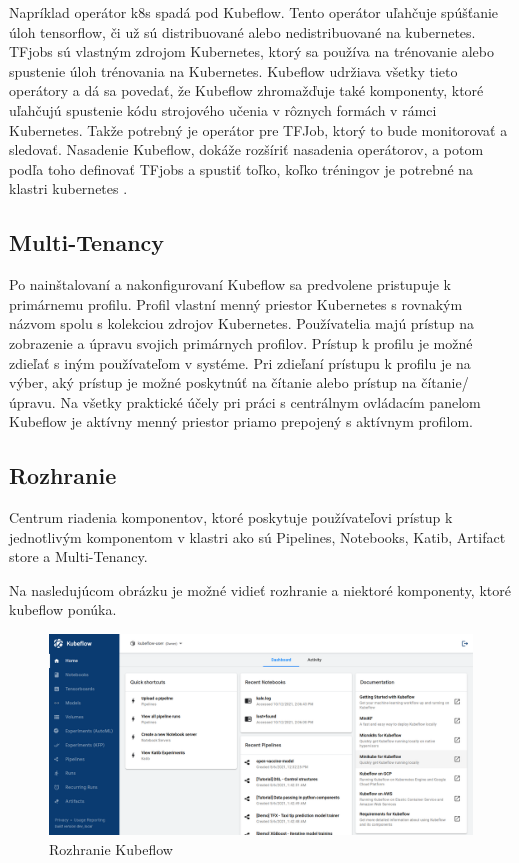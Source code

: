 Napríklad operátor k8s spadá pod Kubeflow. Tento operátor uľahčuje spúšťanie úloh tensorflow, či už sú distribuované alebo nedistribuované na kubernetes. TFjobs sú vlastným zdrojom Kubernetes, ktorý sa používa na trénovanie alebo spustenie úloh trénovania na Kubernetes. Kubeflow udržiava všetky tieto operátory a dá sa povedať, že Kubeflow zhromažďuje také komponenty, ktoré uľahčujú spustenie kódu strojového učenia v rôznych formách v rámci Kubernetes. Takže potrebný je operátor pre TFJob, ktorý to bude monitorovať a sledovať. Nasadenie Kubeflow, dokáže rozšíriť nasadenia operátorov, a potom podľa toho definovať TFjobs a spustiť toľko, koľko tréningov je potrebné na klastri kubernetes \cite{operator}.

\subsection*{Multi-Tenancy}

Po nainštalovaní a nakonfigurovaní Kubeflow sa predvolene pristupuje k primárnemu profilu. Profil vlastní menný priestor Kubernetes s rovnakým názvom spolu s kolekciou zdrojov Kubernetes. Používatelia majú prístup na zobrazenie a úpravu svojich primárnych profilov. Prístup k profilu je možné zdieľať s iným používateľom v systéme. Pri zdieľaní prístupu k profilu je na výber, aký prístup je možné poskytnúť na čítanie alebo prístup na čítanie/úpravu. Na všetky praktické účely pri práci s centrálnym ovládacím panelom Kubeflow je aktívny menný priestor priamo prepojený s aktívnym profilom.

\subsection*{Rozhranie}

Centrum riadenia komponentov, ktoré poskytuje používateľovi prístup k jednotlivým komponentom v klastri ako sú Pipelines, Notebooks, Katib, Artifact store a Multi-Tenancy.

Na nasledujúcom obrázku je možné vidieť rozhranie a niektoré komponenty, ktoré kubeflow ponúka.

\clearpage

\begin{figure}[h!]
    \includegraphics[width=\linewidth]{figures/Rozhranie}
    \caption{ Rozhranie Kubeflow }
\end{figure}

